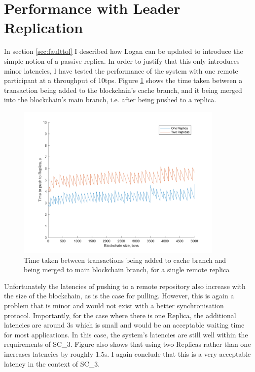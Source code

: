 \documentclass[12pt,a4paper,twoside,openright]{report}
\begin{document}
	\section{Performance with Leader Replication}
	In section \ref{sec:faulttol} I described how Logan can be updated to introduce the simple notion of a passive replica. 
	In order to justify that this only introduces minor latencies, I have tested the performance of the system with one remote participant at a throughput of 10tps. 
	Figure \ref{figs:confirmationtimes}  shows the time taken between a transaction being added to the blockchain's cache branch, and it being merged into the blockchain's main branch, i.e. after being pushed to a replica.
	\begin{figure}
		\centering
		\includegraphics[width=0.9\textwidth]{figs/confirmationlatencies.png}
		\caption{Time taken between transactions being added to cache branch and being merged to main blockchain branch, for a single remote replica}
		\label{figs:confirmationtimes}
	\end{figure}
	Unfortunately the latencies of pushing to a remote repository also increase with the size of the blockchain, as is the case for pulling.
	However, this is again a problem that is minor and would not exist with a better synchronisation protocol. 
	Importantly, for the case where there is one Replica, the additional latencies are around 3s which is small and would be an acceptable waiting time for most applications.
	In this case, the system's latencies are still well within the requirements of SC\_3.
	Figure \cite{figs:confirmationtimes} also shows that using two Replicas rather than one increases latencies by roughly 1.5s. 
	I again conclude that this is a very acceptable latency in the context of SC\_3. \\
\end{document}
